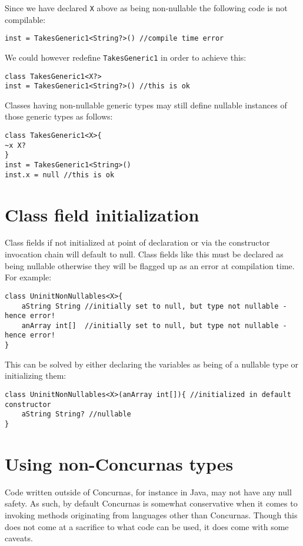 \documentclass[conc-doc]{subfiles}
\begin{document}
Since we have declared \lstinline{X} above as being non-nullable the following code is not compilable:
\begin{lstlisting}
inst = TakesGeneric1<String?>() //compile time error
\end{lstlisting}

We could however redefine \lstinline{TakesGeneric1} in order to achieve this:

\begin{lstlisting}
class TakesGeneric1<X?>
inst = TakesGeneric1<String?>() //this is ok
\end{lstlisting}

Classes having non-nullable generic types may still define nullable instances of those generic types as follows:

\begin{lstlisting}
class TakesGeneric1<X>{
~x X?
}
inst = TakesGeneric1<String>()
inst.x = null //this is ok
\end{lstlisting}


\section{Class field initialization}
Class fields if not initialized at point of declaration or via the constructor invocation chain will default to null. Class fields like this must be declared as being nullable otherwise they will be flagged up as an error at compilation time. For example:
\begin{lstlisting}
class UninitNonNullables<X>{
	aString String //initially set to null, but type not nullable - hence error!
	anArray int[]  //initially set to null, but type not nullable - hence error!
}
\end{lstlisting}

This can be solved by either declaring the variables as being of a nullable type or initializing them:

\begin{lstlisting}
class UninitNonNullables<X>(anArray int[]){ //initialized in default constructor
	aString String? //nullable
}
\end{lstlisting}

\section{Using non-Concurnas types}
Code written outside of Concurnas, for instance in Java, may not have any null safety. As such, by default Concurnas is somewhat conservative when it comes to invoking methods originating from languages other than Concurnas. Though this does not come at a sacrifice to what code can be used, it does come with some caveats.
\end{document}
